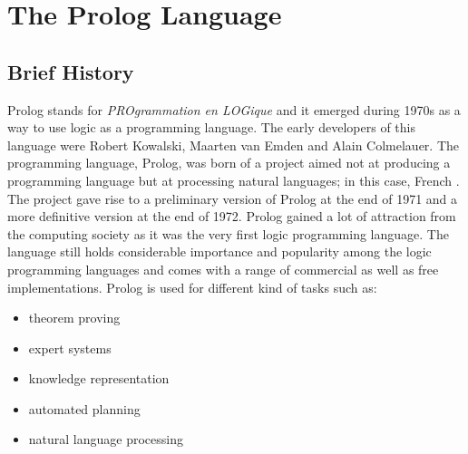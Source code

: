 \section{The Prolog Language}\label{sec:the_prolog_Language}

\subsection{Brief History}\label{subsec:brief_history_prolog}
Prolog stands for \textit{PROgrammation en LOGique} and it emerged during 1970s as a way to use logic as a programming language.
The early developers of this language were Robert Kowalski, Maarten van Emden and Alain Colmelauer. The programming language, Prolog, was born of a project aimed not at producing a programming
language but at processing natural languages; in this case, French \cite{10.1145/155360.155362}. The project gave rise to a preliminary
version of Prolog at the end of 1971 and a more definitive version at the end of 1972.
Prolog gained a lot of attraction from the computing society as it was the very first logic programming language.
The language still holds considerable importance and popularity among the logic programming languages and comes with a range of commercial as well as free implementations.
\newline
Prolog is used for different kind of tasks such as:
\begin{itemize}
    \item theorem proving \cite{coelho1986automated}
    \item expert systems \cite{merritt2012building}
    \item knowledge representation \cite{gelfond2002logic}
    \item automated planning \cite{pinna2015resolving}
    \item natural language processing \cite{lally2011natural}
\end{itemize}


